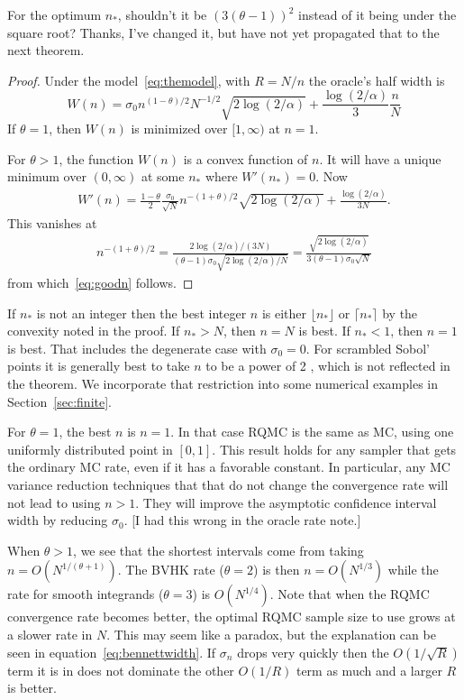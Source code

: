 \documentclass{article}
\newcommand{\art}[1]{\begingroup\color{blue}#1\endgroup}
\newcommand{\aadit}[1]{\begingroup\color{orange}#1\endgroup}
\begin{document}
\aadit{For the optimum $n_*$, shouldn't it be $(3(\theta - 1))^2$ instead of it being under the square root?}
\art{Thanks, I've changed it, but have not yet propagated that to the
next theorem.}

\begin{proof}
Under the model~\eqref{eq:themodel}, with $R=N/n$
the oracle's half width is
$$
W(n)=\sigma_0n^{(1-\theta)/2}N^{-1/2}
\sqrt{2\log(2/\alpha)}
+\frac{\log(2/\alpha)}{3}\frac{n}N
$$
If $\theta=1$, then $W(n)$ is minimized over $[1,\infty)$ at $n=1$.

For $\theta>1$, the function $W(n)$ is a convex function of $n$.
It will have a unique minimum over $(0,\infty)$ at
some $n_*$ where $W'(n_*)=0$. Now
\begin{align*}
W'(n)=\frac{1-\theta}2\frac{\sigma_0}{\sqrt{N}}n^{-(1+\theta)/2}
\sqrt{2\log(2/\alpha)}  + \frac{\log(2/\alpha)}{3N}.
\end{align*}
This vanishes at 
\begin{align*}
n^{-(1+\theta)/2} = 
\frac{2\log(2/\alpha)/(3N)}
{(\theta-1)\sigma_0
\sqrt{2\log(2/\alpha)/N}}=
\frac{\sqrt{2\log(2/\alpha)}}
{3(\theta-1)\sigma_0
\sqrt{N}}
\end{align*}
from which~\eqref{eq:goodn} follows.
\end{proof}

If $n_*$ is not an integer then the
best integer $n$ is either $\lfloor n_*\rfloor$
or $\lceil n_*\rceil$ by the convexity noted in the proof.
If $n_*>N$, then $n=N$ is best. If $n_*<1$, then $n=1$ is best.
That includes the degenerate case with $\sigma_0=0$.
For scrambled Sobol' points it is generally best to
take $n$ to be a power of 2 \cite{Owe22a}, which is not
reflected in the theorem.  We incorporate that restriction
into some numerical examples in Section~\ref{sec:finite}.

For $\theta = 1$, the best $n$ is $n=1$. In that case RQMC is the same as MC, using one uniformly distributed point in $[0,1]$. This result holds for any sampler that gets the ordinary MC rate, even if it has a favorable constant.  In particular, any MC variance reduction techniques that that do not change the convergence rate will not lead to using $n>1$.  They will improve the asymptotic confidence interval width by reducing $\sigma_0$.  \art{[I had this wrong in the oracle rate note.]}

When $\theta>1$, we see that the shortest intervals
come from taking $n = O(N^{1/(\theta+1)})$.
The BVHK rate ($\theta=2$) is then $n=O(N^{1/3})$ while the
rate for smooth integrands ($\theta=3$) is $O(N^{1/4})$.
Note that when the RQMC convergence rate becomes better,
the optimal RQMC sample size to use grows at a slower
rate in $N$.  This may seem like a paradox, but the explanation
can be seen in equation~\eqref{eq:bennettwidth}.
If $\sigma_n$ drops very quickly then the $O(1/\sqrt{R})$ term
it is in does not dominate the other $O(1/R)$ term as much
and a larger $R$ is better.
\end{document}
